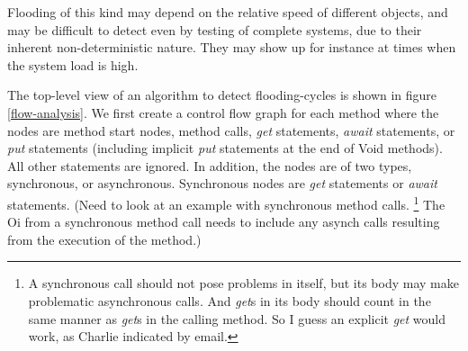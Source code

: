 \documentclass[12pt]{article}%
\begin{document}
Flooding of this kind may depend on the relative
speed of different objects, and  may be difficult to detect even
by testing of complete systems, due to their inherent
non-deterministic nature.  They may show up for instance at times when
the system load is high.



The top-level view of an algorithm to detect flooding-cycles is shown in figure \ref{flow-analysis}.
We first create a control flow graph for each method where the nodes are method start nodes, method calls, \emph{get} statements, 
\emph{await} statements,
or \emph{put} statements (including implicit \emph{put} statements at the end of Void methods).
All other statements are ignored. 
In addition, the nodes are of two types,
synchronous, or asynchronous. Synchronous nodes are \emph{get} statements or \emph{await} statements.
(Need to look at an example with synchronous method calls.
\footnote{
A synchronous call should not pose problems in itself, but its body may make 
problematic asynchronous calls. And \emph{get}s in its body should count in the same manner as \emph{get}s in the calling method. So I guess an explicit \emph{get} would work, as Charlie indicated by email.}
The Oi from a synchronous method call needs to include any asynch calls
resulting from the execution of the method.)
\end{document}
